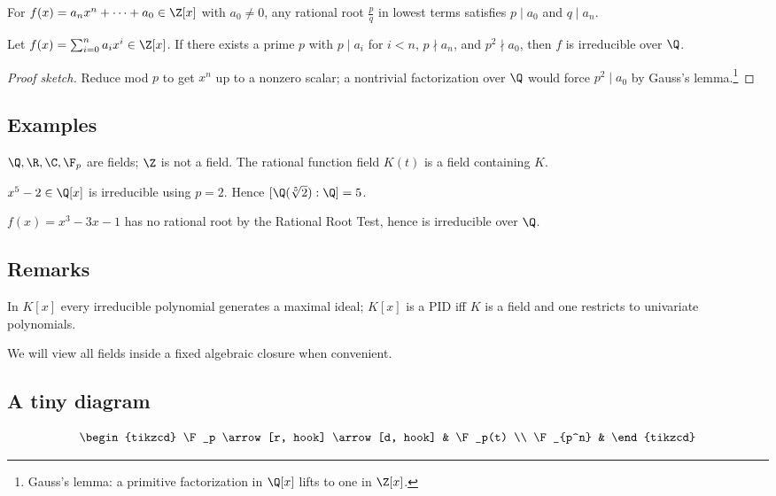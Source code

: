 \begin{theorem}
For $f(x)=a_nx^n+\cdots+a_0\in\Z[x]$ with $a_0\neq 0$, any rational root $\frac{p}{q}$ in lowest terms satisfies $p\mid a_0$ and $q\mid a_n$.
\end{theorem}

\begin{theorem}[Eisenstein]
Let $f(x)=\sum_{i=0}^na_ix^i\in\Z[x]$. If there exists a prime $p$ with $p\mid a_i$ for $i<n$, $p\nmid a_n$, and $p^2\nmid a_0$, then $f$ is irreducible over $\Q$.
\end{theorem}
\begin{proof}[Proof sketch]
Reduce mod $p$ to get $x^n$ up to a nonzero scalar; a nontrivial factorization over $\Q$ would force $p^2\mid a_0$ by Gauss's lemma.\footnote{Gauss's lemma: a primitive factorization in $\Q[x]$ lifts to one in $\Z[x]$.}
\end{proof}

\subsection{Examples}
\begin{example}
$\Q,\R,\C,\F_p$ are fields; $\Z$ is not a field. The rational function field $K(t)$ is a field containing $K$.
\end{example}
\begin{example}
$x^5-2\in\Q[x]$ is irreducible using $p=2$. Hence $[\Q(\sqrt[5]{2}):\Q]=5$.
\end{example}
\begin{example}
$f(x)=x^3-3x-1$ has no rational root by the Rational Root Test, hence is irreducible over $\Q$.
\end{example}

\subsection{Remarks}
\begin{remark}
In $K[x]$ every irreducible polynomial generates a maximal ideal; $K[x]$ is a PID iff $K$ is a field and one restricts to univariate polynomials.
\end{remark}
\begin{remark}
We will view all fields inside a fixed algebraic closure when convenient.
\end{remark}

\subsection{A tiny diagram}
\[
\begin{tikzcd}
\F_p \arrow[r, hook] \arrow[d, hook] & \F_p(t) \\
\F_{p^n} &
\end{tikzcd}
\]

